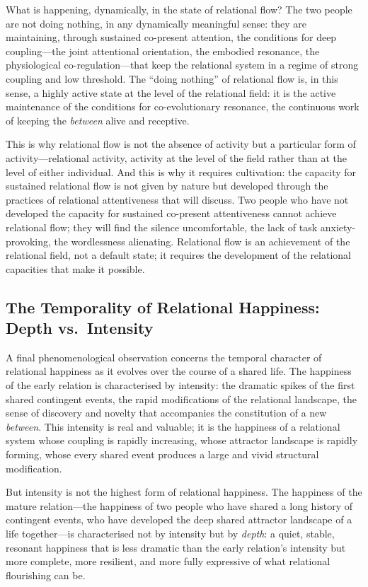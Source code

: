 What is happening, dynamically, in the state of relational flow? The two people are not doing nothing, in any dynamically meaningful sense: they are maintaining, through sustained co-present attention, the conditions for deep coupling---the joint attentional orientation, the embodied resonance, the physiological co-regulation---that keep the relational system in a regime of strong coupling and low threshold. The ``doing nothing'' of relational flow is, in this sense, a highly active state at the level of the relational field: it is the active maintenance of the conditions for co-evolutionary resonance, the continuous work of keeping the \emph{between} alive and receptive.

This is why relational flow is not the absence of activity but a particular form of activity---relational activity, activity at the level of the field rather than at the level of either individual. And this is why it requires cultivation: the capacity for sustained relational flow is not given by nature but developed through the practices of relational attentiveness that  will discuss. Two people who have not developed the capacity for sustained co-present attentiveness cannot achieve relational flow; they will find the silence uncomfortable, the lack of task anxiety-provoking, the wordlessness alienating. Relational flow is an achievement of the relational field, not a default state; it requires the development of the relational capacities that make it possible.

\subsection{The Temporality of Relational Happiness: Depth vs.\ Intensity}
\label{p14:subsec:temporality}

\noindent
A final phenomenological observation concerns the temporal character of relational happiness as it evolves over the course of a shared life. The happiness of the early relation is characterised by intensity: the dramatic spikes of the first shared contingent events, the rapid modifications of the relational landscape, the sense of discovery and novelty that accompanies the constitution of a new \emph{between}. This intensity is real and valuable; it is the happiness of a relational system whose coupling is rapidly increasing, whose attractor landscape is rapidly forming, whose every shared event produces a large and vivid structural modification.

But intensity is not the highest form of relational happiness. The happiness of the mature relation---the happiness of two people who have shared a long history of contingent events, who have developed the deep shared attractor landscape of a life together---is characterised not by intensity but by \emph{depth}: a quiet, stable, resonant happiness that is less dramatic than the early relation's intensity but more complete, more resilient, and more fully expressive of what relational flourishing can be.

